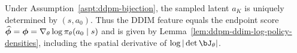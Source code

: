 
\begin{lem}
Under Assumption~\ref{aspt:ddpm-bijection}, the sampled latent $a_K$ is uniquely
determined by $(s,a_0)$. Thus the DDIM feature equals the endpoint score
$\widehat{\boldsymbol{\phi}}=\boldsymbol{\phi}=\nabla_\theta\log\pi_\theta(a_0\mid s)$ and is given by
Lemma~\ref{lem:ddpm-ddim-log-policy-densities}, including the spatial derivative
of $\log|\det\bJ_\theta|$.
\label{lem:feature-concentration-ddim}
\end{lem}

